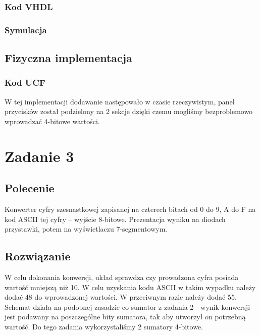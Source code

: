 \documentclass[a4paper,12pt]{extarticle}  %
\begin{document}
\subsubsection{Kod VHDL}

\subsubsection{Symulacja}
\begin{figure}[H]
	\centering
\end{figure}
\subsection{Fizyczna implementacja}
\subsubsection{Kod UCF}


W tej implementacji dodawanie następowało w czasie rzeczywistym, panel przycisków został podzielony na 2 sekcje dzięki czemu mogliśmy bezproblemowo wprowadzać 4-bitowe wartości.
\section{Zadanie 3}
\subsection{Polecenie}
Konwerter cyfry szesnastkowej zapisanej na czterech bitach od 0 do 9, A do F 
na kod ASCII tej cyfry – wyjście 8-bitowe. Prezentacja wyniku na diodach 
przystawki, potem na wyświetlaczu 7-segmentowym. 
\subsection{Rozwiązanie}
W celu dokonania konwersji, układ sprawdza czy prowadzona cyfra posiada wartość mniejszą niż 10. W celu uzyskania kodu ASCII w takim wypadku należy dodać 48 do wprowadzonej wartości.
W przeciwnym razie należy dodać 55.
Schemat działa na podobnej zasadzie co sumator z zadania 2 - wynik konwersji jest podawany na poszczególne bity sumatora, tak aby utworzył on potrzebną wartość.
Do tego zadania wykorzystaliśmy 2 sumatory 4-bitowe.
\end{document}
